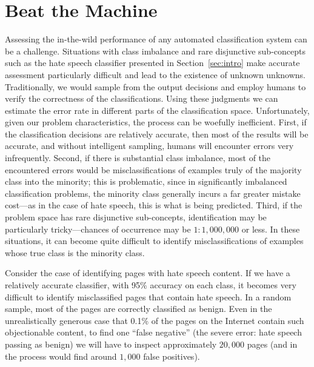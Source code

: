 \section{Beat the Machine}
\label{sec:btm}


Assessing the in-the-wild performance of any automated classification system can be a challenge. Situations with class imbalance and rare disjunctive sub-concepts such as the hate speech classifier presented in Section~\ref{sec:intro} make accurate assessment particularly difficult and lead to the existence of unknown unknowns. Traditionally, we would sample from the output decisions and employ humans to verify the correctness of the classifications.  Using these judgments we can estimate the error rate in different parts of the classification space. Unfortunately, given our problem characteristics, the process can be woefully inefficient. First, if the classification decisions are relatively accurate, then most of the results will be accurate, and without intelligent sampling, humans will encounter errors very infrequently. Second, if there is substantial class imbalance, most of the encountered errors would be misclassifications of examples truly of the majority class into the minority; this is problematic, since in significantly imbalanced classification problems, the minority class generally incurs a far greater mistake cost---as in the case of hate speech, this is what is being predicted. Third, if the problem space has rare disjunctive sub-concepts, identification may be particularly tricky---chances of occurrence may be $1:1,000,000$ or less. In these situations, it can become quite difficult to identify misclassifications of examples whose true class is the minority class. 

\begin{xmpl} Consider the case of identifying pages with hate speech content. If we have a relatively accurate classifier, with 95\% accuracy on each class, it becomes very difficult to identify misclassified pages that contain hate speech. In a random sample, most of the pages are correctly classified as benign. Even in the unrealistically generous case that 
0.1\% of the pages on the Internet contain such objectionable content, to find one ``false negative'' (the severe error: hate speech passing as benign) we will have to inspect approximately $20,000$ pages (and in the process would find around $1,000$ false positives). \smartqed

\end{xmpl} 

